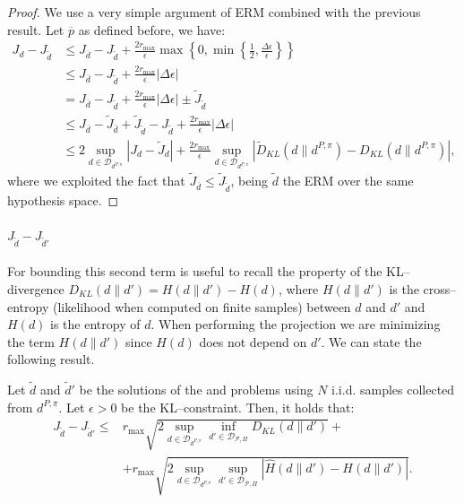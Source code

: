 \begin{proof}
We use a very simple argument of ERM combined with the previous result. Let $\overline{p}$ as defined before, we have:
	\begin{align*}
		J_d - J_{\widetilde{d}} & \le J_{\overline{d}} - J_{\widetilde{d}} + \frac{2 r_{\max}}{\epsilon}\max \left\{0, \min\left\{\frac{1}{2}, \frac{\Delta \epsilon}{\epsilon} \right\} \right\}  \\
		& \le J_{\overline{d}} - J_{\widetilde{d}} + \frac{2 r_{\max}}{\epsilon} |\Delta\epsilon| \\
		& = J_{\overline{d}} - J_{\widetilde{d}} + \frac{2 r_{\max}}{\epsilon} |\Delta\epsilon| \pm \widetilde{J}_{\widetilde{d}} \\
		& \le J_{\overline{d}} - \widetilde{J}_{\overline{d}} + \widetilde{J}_{\widetilde{d}} - J_{\widetilde{d}} + \frac{2 r_{\max}}{\epsilon} |\Delta\epsilon|   \\
		& \le 2 \sup_{d \in \mathcal{D}_{d^{P,\pi}}} | J_d - \widetilde{J}_d | + \frac{2 r_{\max}}{\epsilon} \sup_{d \in \mathcal{D}_{d^{P,\pi}}}  \left| {\widetilde{D}}_{KL}(d \|d^{P,\pi})- D_{KL}(d \|d^{P,\pi})\right|, 
	\end{align*}
	where we exploited the fact that $\widetilde{J}_{\overline{d}} \le \widetilde{J}_{\widetilde{d}} $, being $\widetilde{d}$ the ERM over the same hypothesis space.
\end{proof}

\paragraph{$J_{\widetilde{d}}- J_{\widetilde{d}'}$}
For bounding this second term is useful to recall the property of the KL--divergence	$D_{KL} (d \| d') = H(d \| d') - H(d)$, where $H(d \| d')$ is the cross--entropy (likelihood when computed on finite samples) between $d$ and $d'$ and $H(d)$ is the entropy of $d$. When performing the projection we are minimizing the term $H(d \| d')$ since $H(d)$ does not depend on $d'$. We can state the following result.

\begin{lemma}
\label{lemma:second}
	Let $\widetilde{d}$ and $\widetilde{d}'$ be the solutions of the \opthat{\epsilon} and  problems using $N$ i.i.d. samples collected from $d^{P,\pi}$. Let $\epsilon > 0$ be the KL--constraint. Then, it holds that:
		\begin{align}
	J_{\widetilde{d}} - J_{\widetilde{d}'} \le &r_{\max} \sqrt{2 \sup_{d \in \mathcal{D}_{d^{P,\pi}}}  \inf_{d' \in \mathcal{D}_{\mathcal{P}, \Pi}} D_{KL}( d \| d')} +\\ &+ r_{\max} \sqrt{2 \sup_{d \in \mathcal{D}_{d^{P,\pi}}} \sup_{d' \in \mathcal{D}_{\mathcal{P}, \Pi}} \left| \widehat{H} (d \| d') -  H(d \| d') \right|}.
		\end{align}
\end{lemma}

